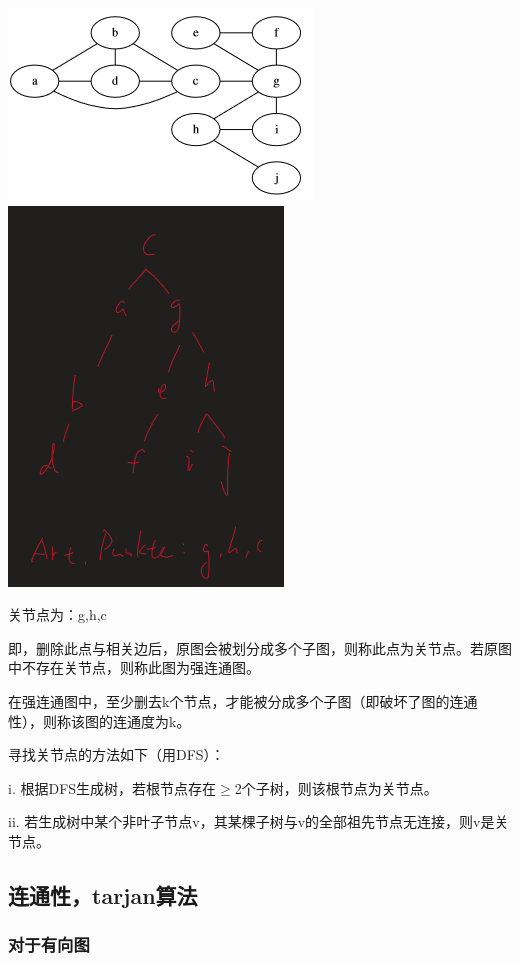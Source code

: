 \documentclass[a4paper]{article}    %
\begin{document}
\begin{center}
    \includegraphics[scale=0.6]{18.png}
    \includegraphics[scale=0.6]{19.png}
\end{center}

关节点为：g,h,c

即，删除此点与相关边后，原图会被划分成多个子图，则称此点为关节点。若原图中不存在关节点，则称此图为强连通图。

在强连通图中，至少删去k个节点，才能被分成多个子图（即破坏了图的连通性），则称该图的连通度为k。

\noindent 寻找关节点的方法如下（用DFS）：

i. 根据DFS生成树，若根节点存在$\geq$2个子树，则该根节点为关节点。

ii. 若生成树中某个非叶子节点v，其某棵子树与v的全部祖先节点无连接，则v是关节点。

\subsection{连通性，tarjan算法}

\subsubsection{对于有向图}
\end{document}
